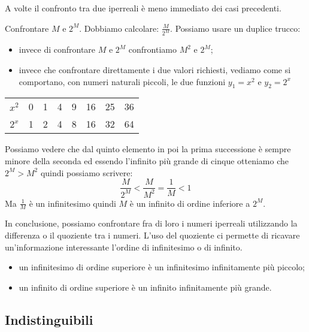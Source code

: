 \vspace{1em}
A volte il confronto tra due iperreali è meno immediato dei casi precedenti.
\begin{esempio}
 Confrontare \(M\) e \(2^M\). 
 Dobbiamo calcolare: \(\frac{M}{2^M}\). 
Possiamo usare un duplice trucco: 
\begin{itemize} [nosep]
 \item invece di confrontare \(M\) e \(2^M\) confrontiamo \(M^2\) e \(2^M\);
 \item invece che confrontare direttamente i due valori richiesti, vediamo 
come si comportano, con numeri naturali piccoli, le due funzioni 
\(y_1=x^2\) e \(y_2=2^x\)
\end{itemize}
\begin{center}
\begin{tabular}{cccccccc}
\(x^2\) & 0 & 1 & 4 & 9 & 16 & 25 & 36\\
\(2^x\) & 1 & 2 & 4 & 8 & 16 & 32 & 64
\end{tabular}
\end{center}
Possiamo vedere che dal quinto elemento in poi la prima successione è sempre
minore della seconda ed essendo l'infinito più grande di cinque 
otteniamo che \(2^M > M^2\) quindi possiamo scrivere:
\[\frac{M}{2^M} < \frac{M}{M^2} = \frac{1}{M} < 1\]
Ma \(\frac{1}{M}\) è un infinitesimo quindi \(M\) è un infinito di ordine 
inferiore a \(2^M\).
\end{esempio}

In conclusione, possiamo confrontare fra di loro i numeri iperreali 
utilizzando la differenza o il quoziente tra i numeri. L'uso del quoziente 
ci permette di ricavare un'informazione interessante l'ordine di 
infinitesimo o di infinito.
\begin{itemize} [noitemsep]
 \item un infinitesimo di ordine superiore è un infinitesimo infinitamente 
 più piccolo;
 \item un infinito di ordine superiore è un infinito infinitamente più 
grande.
\end{itemize}

\subsection{Indistinguibili}
\label{subsec:insnum_indistinguibili}

